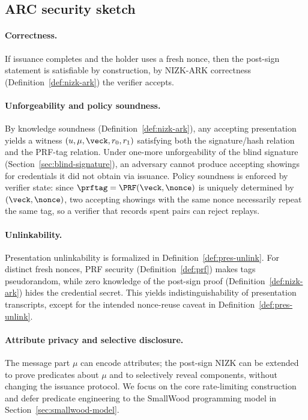 \subsection{ARC security sketch}
\paragraph{Correctness.}
If issuance completes and the holder uses a fresh nonce, then the post-sign statement is satisfiable by construction,
by NIZK-ARK correctness (Definition~\ref{def:nizk-ark}) the verifier accepts.
\paragraph{Unforgeability and policy soundness.}
By knowledge soundness (Definition~\ref{def:nizk-ark}), any accepting presentation yields a witness
\((u,\mu,\veck,r_0,r_1)\) satisfying both the signature/hash relation and the PRF-tag relation.
Under one-more unforgeability of the blind signature (Section~\ref{sec:blind-signature}), an adversary cannot produce
accepting showings for credentials it did not obtain via issuance. Policy soundness is enforced by verifier state:
since \(\prftag=\PRF(\veck,\nonce)\) is uniquely determined by \((\veck,\nonce)\), two accepting
showings with the same nonce necessarily repeat the same tag, so a verifier that records spent pairs can reject replays.

\paragraph{Unlinkability.}
Presentation unlinkability is formalized in Definition~\ref{def:pres-unlink}. For distinct fresh nonces, PRF security
(Definition~\ref{def:prf}) makes tags pseudorandom, while zero knowledge of the post-sign proof (Definition~\ref{def:nizk-ark})
hides the credential secret. This yields indistinguishability of presentation transcripts, except for the intended
nonce-reuse caveat in Definition~\ref{def:pres-unlink}.

\paragraph{Attribute privacy and selective disclosure.}
The message part \(\mu\) can encode attributes; the post-sign NIZK can be extended to prove predicates about \(\mu\) and
to selectively reveal components, without changing the issuance protocol. We focus on the core rate-limiting
construction and defer predicate engineering to the SmallWood programming model in
Section~\ref{sec:smallwood-model}.
